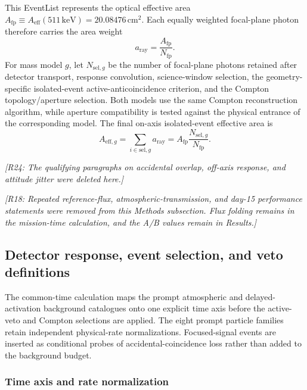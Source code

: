 \documentclass[11pt]{article}
\newcommand{\revdeleted}[1]{\par\noindent\textcolor{revisionblue}{\small\itshape [#1]}\par}
\newcommand{\revblue}[1]{\textcolor{revisionblue}{#1}}
\newcommand{\keV}{\ensuremath{\,\mathrm{keV}}}
\begin{document}
This EventList represents the optical effective area
$A_{\mathrm{fp}}\equiv A_{\mathrm{eff}}(511\keV)=20.08476\,\mathrm{cm^2}$.
Each equally weighted focal-plane photon therefore carries the area weight
\begin{equation}
 a_{\mathrm{ray}}=\frac{A_{\mathrm{fp}}}{N_{\mathrm{fp}}}.
 \label{eq:focal_eventlist_area_weight}
\end{equation}
For mass model $g$, let $N_{\mathrm{sel},g}$ be the number of focal-plane
photons retained after detector transport, response convolution, science-window
selection, the geometry-specific isolated-event active-anticoincidence
criterion, and the Compton topology/aperture selection. Both models use the
same Compton reconstruction algorithm, while aperture compatibility is tested
against the physical entrance of the corresponding model. The final on-axis
isolated-event effective area is
\begin{equation}
 A_{\mathrm{eff},g}
 =\sum_{i\in\mathrm{sel},g}a_{\mathrm{ray}}
 =A_{\mathrm{fp}}\frac{N_{\mathrm{sel},g}}{N_{\mathrm{fp}}}.
 \label{eq:selected_signal_effective_area}
\end{equation}
\revdeleted{R24: The qualifying paragraphs on accidental overlap, off-axis response, and attitude jitter were deleted here.}
\endgroup

\revdeleted{R18: Repeated reference-flux, atmospheric-transmission, and day-15
performance statements were removed from this Methods subsection. Flux folding
remains in the mission-time calculation, and the A/B values remain in Results.}

\subsection{Detector response, event selection, and veto definitions}
\label{sec:selection}

The common-time calculation maps the prompt atmospheric and delayed-activation
background catalogues onto one explicit time axis before the active-veto and
Compton selections are applied. \revblue{The eight prompt particle families
retain independent physical-rate normalizations}. Focused-signal events are inserted as
conditional probes of accidental-coincidence loss rather than added to the
background budget.

\subsubsection{Time axis and rate normalization}
\label{subsec:time_axis}
\end{document}
